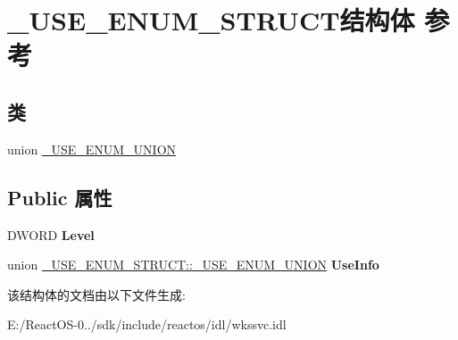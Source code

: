 \hypertarget{struct___u_s_e___e_n_u_m___s_t_r_u_c_t}{}\section{\+\_\+\+U\+S\+E\+\_\+\+E\+N\+U\+M\+\_\+\+S\+T\+R\+U\+C\+T结构体 参考}
\label{struct___u_s_e___e_n_u_m___s_t_r_u_c_t}
\subsection*{类}
\begin{DoxyCompactItemize}
\item 
union \hyperlink{union___u_s_e___e_n_u_m___s_t_r_u_c_t_1_1___u_s_e___e_n_u_m___u_n_i_o_n}{\+\_\+\+U\+S\+E\+\_\+\+E\+N\+U\+M\+\_\+\+U\+N\+I\+ON}
\end{DoxyCompactItemize}
\subsection*{Public 属性}
\begin{DoxyCompactItemize}
\item 
\mbox{\label{struct___u_s_e___e_n_u_m___s_t_r_u_c_t_a3d888323332edec98e4bee2c8c65024b}} 
D\+W\+O\+RD {\bfseries Level}
\item 
\mbox{\label{struct___u_s_e___e_n_u_m___s_t_r_u_c_t_a75e11d07731dc034867db28b246f4de7}} 
union \hyperlink{union___u_s_e___e_n_u_m___s_t_r_u_c_t_1_1___u_s_e___e_n_u_m___u_n_i_o_n}{\+\_\+\+U\+S\+E\+\_\+\+E\+N\+U\+M\+\_\+\+S\+T\+R\+U\+C\+T\+::\+\_\+\+U\+S\+E\+\_\+\+E\+N\+U\+M\+\_\+\+U\+N\+I\+ON} {\bfseries Use\+Info}
\end{DoxyCompactItemize}


该结构体的文档由以下文件生成\+:\begin{DoxyCompactItemize}
\item 
E\+:/\+React\+O\+S-\/0../sdk/include/reactos/idl/wkssvc.\+idl\end{DoxyCompactItemize}
